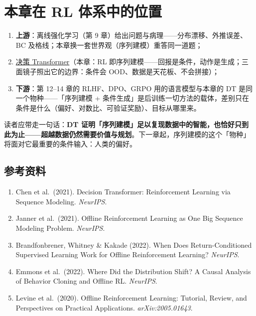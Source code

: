 \documentclass{article}
\begin{document}
\section*{本章在 RL 体系中的位置}

\begin{enumerate}
  \item \textbf{上游}：离线强化学习（第 9 章）给出问题与病理——分布漂移、外推误差、BC 及格线；本章换一套世界观（序列建模）重答同一道题；
  \item \underline{决策 Transformer}（本章：RL 即序列建模——回报是条件，动作是生成；三面镜子照出它的边界：条件会 OOD、数据是天花板、不会拼接）；
  \item \textbf{下游}：第 12--14 章的 RLHF、DPO、GRPO 用的语言模型与本章的 DT 是同一个物种——「序列建模 + 条件生成」是后训练一切方法的载体，差别只在条件是什么（偏好、对数比、可验证奖励）、目标从哪里来。
\end{enumerate}

读者应带走一句话：\textbf{DT 证明「序列建模」足以复现数据中的智能，也恰好只到此为止——超越数据仍然需要价值与规划}。下一章起，序列建模的这个「物种」将面对它最重要的条件输入：人类的偏好。

\subsection*{参考资料}

\begin{enumerate}
  \item Chen et al.\ (2021). Decision Transformer: Reinforcement Learning via Sequence Modeling. \textit{NeurIPS}.
  \item Janner et al.\ (2021). Offline Reinforcement Learning as One Big Sequence Modeling Problem. \textit{NeurIPS}.
  \item Brandfonbrener, Whitney \& Kakade (2022). When Does Return-Conditioned Supervised Learning Work for Offline Reinforcement Learning? \textit{NeurIPS}.
  \item Emmons et al.\ (2022). Where Did the Distribution Shift? A Causal Analysis of Behavior Cloning and Offline RL. \textit{NeurIPS}.
  \item Levine et al.\ (2020). Offline Reinforcement Learning: Tutorial, Review, and Perspectives on Practical Applications. \textit{arXiv:2005.01643}.
\end{enumerate}
\end{document}

